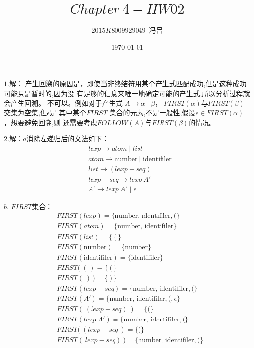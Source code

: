 \documentclass[UTF8,noindent]{ctexart}
\title{$Chapter\ 4-HW02$}
\author{$2015K8009929049$\ 冯吕}
\date{\today}
\begin{document}
\maketitle
{}

$1.$解： 产生回溯的原因是，即使当非终结符用某个产生式匹配成功,但是这种成功可能只是暂时的,因为没
有足够的信息来唯一地确定可能的产生式,所以分析过程就会产生回溯。
不可以。例如对于产生式 $A\rightarrow \alpha\mid \beta$， $FIRST(\alpha)$与$FIRST(\beta)$交集为空集,但$\epsilon$是
其中某个$FIRST$ 集合的元素,不是一般性,假设$\epsilon\in FIRST(\alpha)$，想要避免回溯,则
还需要考虑$FOLLOW(A)$与$FIRST(\beta)$的情况。

$2.$解：$a$消除左递归后的文法如下：
\begin{align*}
  &lexp \rightarrow atom \mid list\\
  &atom \rightarrow \text{number}\mid \text{identifiler}\\
  &list \rightarrow (lexp-seq)\\
  &lexp-seq\rightarrow lexp\ A'\\
  &A'\rightarrow lexp\ A'\mid \epsilon
\end{align*}

$b.$ $FIRST$集合：
\begin{align*}
  &FIRST(lexp) = \{\text{number, identifiler}, (\}\\
	&FIRST(atom) = \{\text{number, identifiler}\}\\
	&FIRST(list) = \{\ (\ \}\\
	  &FIRST(\text{number}) = \{\text{number}\}\\
	&FIRST(\text{identifiler}) = \{\text{identifiler}\}\\
	  &FIRST(\ ( \ ) =  \{\ (\ \}\\
	&FIRST(\ ) \ ) = \{\ ) \ \}\\
	&FIRST(lexp-seq) = \{\text{number, identifiler}, ( \}\\
	  &FIRST(A') = \{\text{number, identifiler}, (, \epsilon\}\\
		&FIRST( \ (lexp-seq)\ ) = \{ ( \} \\
		  &FIRST(lexp \ A') = \{\text{number, identifiler}, (\}\\
			&FIRST(\ (lexp-seq\ ) = \{(\}\\
			  &FIRST( \ lexp-seq )\ ) = \{\text{number, identifiler}, (\}
\end{align*}
\end{document}
